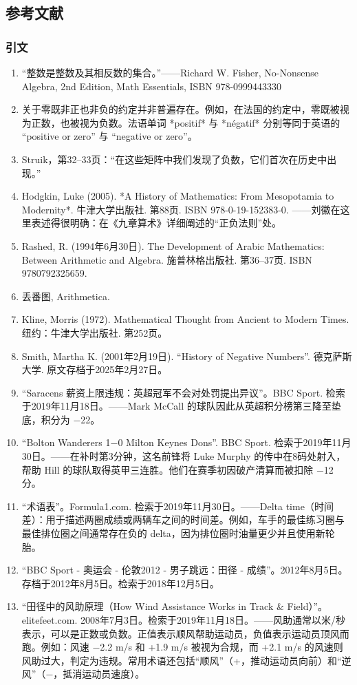 \subsection{参考文献}
\subsubsection{引文}
\begin{enumerate}
\item “整数是整数及其相反数的集合。”——Richard W. Fisher, No-Nonsense Algebra, 2nd Edition, Math Essentials, ISBN 978-0999443330
\item 关于零既非正也非负的约定并非普遍存在。例如，在法国的约定中，零既被视为正数，也被视为负数。法语单词 *positif* 与 *négatif* 分别等同于英语的 “positive or zero” 与 “negative or zero”。
\item Struik，第32–33页：“在这些矩阵中我们发现了负数，它们首次在历史中出现。”
\item Hodgkin, Luke (2005). *A History of Mathematics: From Mesopotamia to Modernity*. 牛津大学出版社. 第88页. ISBN 978-0-19-152383-0. ——刘徽在这里表述得很明确：在《九章算术》详细阐述的“正负法则”处。
\item Rashed, R. (1994年6月30日). The Development of Arabic Mathematics: Between Arithmetic and Algebra. 施普林格出版社. 第36–37页. ISBN 9780792325659.
\item 丢番图, Arithmetica.
\item Kline, Morris (1972). Mathematical Thought from Ancient to Modern Times. 纽约：牛津大学出版社. 第252页。
\item Smith, Martha K. (2001年2月19日). “History of Negative Numbers”. 德克萨斯大学. 原文存档于2025年2月27日。
\item “Saracens 薪资上限违规：英超冠军不会对处罚提出异议”。BBC Sport. 检索于2019年11月18日。——Mark McCall 的球队因此从英超积分榜第三降至垫底，积分为 −22。
\item “Bolton Wanderers 1−0 Milton Keynes Dons”. BBC Sport. 检索于2019年11月30日。——在补时第3分钟，这名前锋将 Luke Murphy 的传中在8码处射入，帮助 Hill 的球队取得英甲三连胜。他们在赛季初因破产清算而被扣除 −12 分。
\item “术语表”。Formula1.com. 检索于2019年11月30日。——Delta time（时间差）：用于描述两圈成绩或两辆车之间的时间差。例如，车手的最佳练习圈与最佳排位圈之间通常存在负的 delta，因为排位圈时油量更少并且使用新轮胎。
\item “BBC Sport - 奥运会 - 伦敦2012 - 男子跳远：田径 - 成绩”。2012年8月5日。存档于2012年8月5日。检索于2018年12月5日。
\item  “田径中的风助原理（How Wind Assistance Works in Track & Field）”。elitefeet.com. 2008年7月3日。检索于2019年11月18日。——风助通常以米/秒表示，可以是正数或负数。正值表示顺风帮助运动员，负值表示运动员顶风而跑。例如：风速 −2.2 m/s 和 +1.9 m/s 被视为合规，而 +2.1 m/s 的风速则风助过大，判定为违规。常用术语还包括“顺风”（+，推动运动员向前）和“逆风”（−，抵消运动员速度）。

\end{enumerate}
